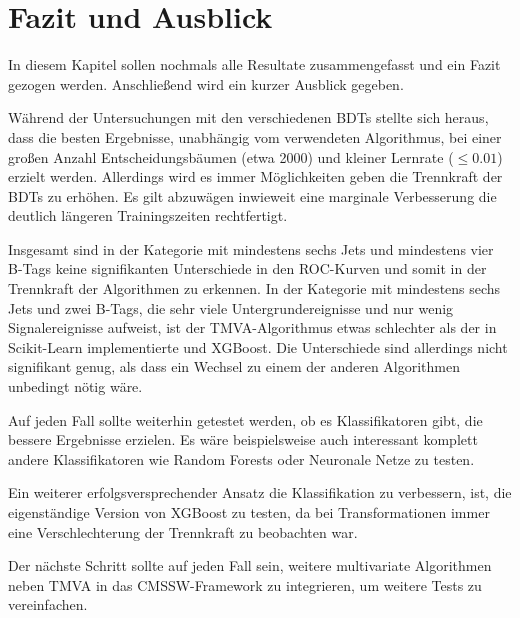 
\chapter{Fazit und Ausblick}
\label{ch:Fazit}

{}

In diesem Kapitel sollen nochmals alle Resultate zusammengefasst und ein Fazit gezogen werden. Anschlie\ss end wird ein kurzer Ausblick gegeben.

W\"ahrend der Untersuchungen mit den verschiedenen BDTs stellte sich heraus, dass die besten Ergebnisse, unabh\"angig vom verwendeten Algorithmus, bei einer gro\ss en Anzahl Entscheidungsb\"aumen (etwa 2000) und kleiner Lernrate ($\leq \num{0,01}$) erzielt werden. Allerdings wird es immer M\"oglichkeiten geben die Trennkraft der BDTs zu erh\"ohen. Es gilt abzuw\"agen inwieweit eine marginale Verbesserung die deutlich l\"angeren Trainingszeiten rechtfertigt.

Insgesamt sind in der Kategorie mit mindestens sechs Jets und mindestens vier B-Tags keine signifikanten Unterschiede in den ROC-Kurven und somit in der Trennkraft der Algorithmen zu erkennen. In der Kategorie mit mindestens sechs Jets und zwei B-Tags, die sehr viele Untergrundereignisse und nur wenig Signalereignisse aufweist, ist der TMVA-Algorithmus etwas schlechter als der in Scikit-Learn implementierte und XGBoost. Die Unterschiede sind allerdings nicht signifikant genug, als dass ein Wechsel zu einem der anderen Algorithmen unbedingt n\"otig w\"are.

Auf jeden Fall sollte weiterhin getestet werden, ob es Klassifikatoren gibt, die bessere Ergebnisse erzielen. Es w\"are beispielsweise auch interessant komplett andere Klassifikatoren wie Random Forests oder Neuronale Netze zu testen.

Ein weiterer erfolgsversprechender Ansatz die Klassifikation zu verbessern, ist, die eigenst\"andige Version von XGBoost zu testen, da bei Transformationen immer eine Verschlechterung der Trennkraft zu beobachten war.

Der n\"achste Schritt sollte auf jeden Fall sein, weitere multivariate Algorithmen neben TMVA in das CMSSW-Framework zu integrieren, um weitere Tests zu vereinfachen.